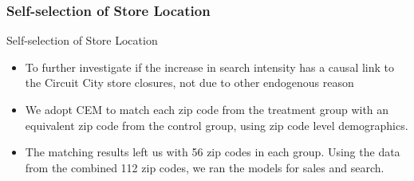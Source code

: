 \documentclass[mathserif, xcolor=table]{beamer}
\begin{document}
\subsubsection{Self-selection of Store Location}
\begin{frame}[allowframebreaks]{Self-selection of Store Location}
	\begin{itemize}
		\item To further investigate if the increase in search intensity has a
		causal link to the Circuit City store closures, not due to 
		other endogenous reason
		\item We adopt CEM to match each zip code from
		the treatment group with an equivalent zip code from the
		control group, using zip code level demographics.
		\item The matching results left us with 56 zip codes in each group.
		Using the data from the combined 112 zip codes, we ran the
		models for sales and search.
	\end{itemize}
	\framebreak
	\begin{table}[!htbp] \centering 
		\caption{Results of the Online Sales and Search Effect After Matching Zip Codes: TotalMonthlySales, PagesPerDollar, and MinsPerDollar (All Product Categories)} 
		\label{tab:table11} 
\end{table}
\end{frame}
\end{document}

